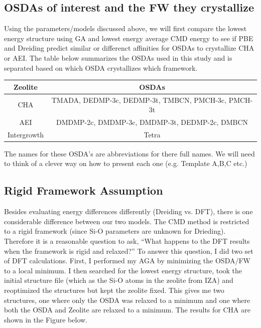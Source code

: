 \documentclass[journal=accacs,manuscript=article, email=true, layout=traditional]{achemso}
\begin{document}
\subsection{OSDAs of interest and the FW they crystallize}
\label{sec:orgef421f5}
Using the parameters/models discussed above, we will first compare the lowest energy structure using GA and lowest energy average CMD energy to see if PBE and Dreiding predict similar or differenct affinities for OSDAs to crystallize CHA or AEI. The table below summarizes the OSDAs used in this study and is separated based on which OSDA crystallizes which framework. 

\begin{center}
\begin{tabular}{c|c}
\hline
Zeolite & OSDAs \\
\hline
CHA          & TMADA, DEDMP-3c, DEDMP-3t, TMBCN, PMCH-3c, PMCH-3t \\
AEI          & DMDMP-2c, DMDMP-3c, DMDMP-3t, DEDMP-2c, DMBCN \\
Intergrowth  & Tetra \\
\hline
\end{tabular}
\end{center}

The names for these OSDA's are abbreviations for there full names. We will need to think of a clever way on how to present each one (e.g. Template A,B,C etc.)

\subsection{Rigid Framework Assumption}
\label{sec:org4e44f64}
Besides evaluating energy differences differently (Dreiding vs. DFT), there is one considerable difference between our two models. The CMD method is restricted to a rigid framework (since Si-O parameters are unknown for Drieding). Therefore it is a reasonable question to ask, ``What happens to the DFT results when the framework is rigid and relaxed?'' To answer this question, I did two set of DFT calculations. First, I performed my AGA by minimizing the OSDA/FW to a local minimum. I then searched for the lowest energy structure, took the initial structure file (which as the Si-O atoms in the zeolite from IZA) and reoptimized the structures but kept the zeolite fixed. This gives me two structures, one where only the OSDA was relaxed to a minimum and one where both the OSDA and Zeolite are relaxed to a minimum. The results for CHA are shown in the Figure below.
\end{document}
